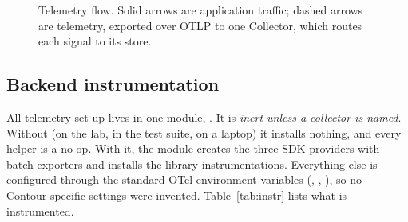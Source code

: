 \documentclass[11pt,a4paper]{article}
\begin{document}
\begin{figure}[H]
  \caption{Telemetry flow. Solid arrows are application traffic; dashed arrows are telemetry,
    exported over OTLP to one Collector, which routes each signal to its store.}
  \label{fig:arch}
\end{figure}

\subsection{Backend instrumentation}
All telemetry set-up lives in one module, . It is
\emph{inert unless a collector is named}. Without  (on the lab,
in the test suite, on a laptop) it installs nothing, and every helper is a no-op. With it, the
module creates the three SDK providers with batch exporters and installs the library
instrumentations. Everything else is configured through the standard OTel environment variables
(, , ),
so no Contour-specific settings were invented. Table~\ref{tab:instr} lists what is instrumented.
\end{document}
